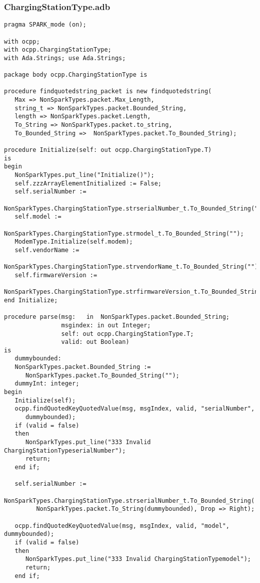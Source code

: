\documentclass[12pt,openany,a4paper]{book}
\begin{document}
\subsubsection{ChargingStationType.adb}
\begin{verbatim}
pragma SPARK_mode (on); 

with ocpp;
with ocpp.ChargingStationType;
with Ada.Strings; use Ada.Strings;

package body ocpp.ChargingStationType is 

procedure findquotedstring_packet is new findquotedstring(
   Max => NonSparkTypes.packet.Max_Length, 
   string_t => NonSparkTypes.packet.Bounded_String, 
   length => NonSparkTypes.packet.Length,
   To_String => NonSparkTypes.packet.to_string,
   To_Bounded_String =>  NonSparkTypes.packet.To_Bounded_String);

procedure Initialize(self: out ocpp.ChargingStationType.T)
is
begin
   NonSparkTypes.put_line("Initialize()");
   self.zzzArrayElementInitialized := False;
   self.serialNumber := 
      NonSparkTypes.ChargingStationType.strserialNumber_t.To_Bounded_String("");
   self.model := 
      NonSparkTypes.ChargingStationType.strmodel_t.To_Bounded_String("");
   ModemType.Initialize(self.modem);
   self.vendorName := 
   NonSparkTypes.ChargingStationType.strvendorName_t.To_Bounded_String("");
   self.firmwareVersion := 
   NonSparkTypes.ChargingStationType.strfirmwareVersion_t.To_Bounded_String("");
end Initialize;

procedure parse(msg:   in  NonSparkTypes.packet.Bounded_String;
                msgindex: in out Integer;
                self: out ocpp.ChargingStationType.T;
                valid: out Boolean)
is
   dummybounded:
   NonSparkTypes.packet.Bounded_String := 
      NonSparkTypes.packet.To_Bounded_String("");
   dummyInt: integer;
begin
   Initialize(self);
   ocpp.findQuotedKeyQuotedValue(msg, msgIndex, valid, "serialNumber", 
      dummybounded);
   if (valid = false) 
   then 
      NonSparkTypes.put_line("333 Invalid ChargingStationTypeserialNumber"); 
      return; 
   end if;

   self.serialNumber :=
      NonSparkTypes.ChargingStationType.strserialNumber_t.To_Bounded_String(
         NonSparkTypes.packet.To_String(dummybounded), Drop => Right);

   ocpp.findQuotedKeyQuotedValue(msg, msgIndex, valid, "model", dummybounded);
   if (valid = false) 
   then 
      NonSparkTypes.put_line("333 Invalid ChargingStationTypemodel"); 
      return; 
   end if;


\end{verbatim}
\end{document}
